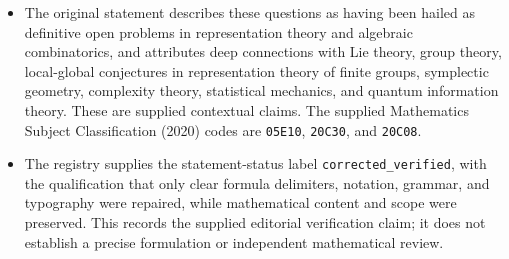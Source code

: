 \documentclass[11pt]{article}
\begin{document}
\begin{itemize}
\item The original statement describes these questions as having been hailed as definitive open problems in representation theory and algebraic combinatorics, and attributes deep connections with Lie theory, group theory, local-global conjectures in representation theory of finite groups, symplectic geometry, complexity theory, statistical mechanics, and quantum information theory. These are supplied contextual claims. The supplied Mathematics Subject Classification (2020) codes are \texttt{05E10}, \texttt{20C30}, and \texttt{20C08}.
\item The registry supplies the statement-status label \texttt{corrected\_verified}, with the qualification that only clear formula delimiters, notation, grammar, and typography were repaired, while mathematical content and scope were preserved. This records the supplied editorial verification claim; it does not establish a precise formulation or independent mathematical review.
\end{itemize}
\end{document}

